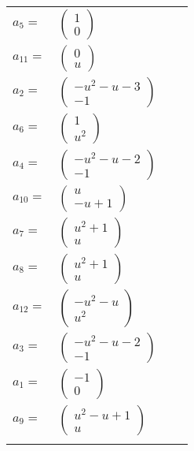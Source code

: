 \documentclass[1p]{elsarticle_modified}
\theoremstyle{definition}
\begin{document}
\begin{tabular}{m{7pt} m{180pt} m{7pt} m{180pt} }
\flushright $a_{5}=$&$\begin{pmatrix}1\\0\end{pmatrix}$ \\
\flushright $a_{11}=$&$\begin{pmatrix}0\\u\end{pmatrix}$ \\
\flushright $a_{2}=$&$\begin{pmatrix}- u^2- u-3\\-1\end{pmatrix}$ \\
\flushright $a_{6}=$&$\begin{pmatrix}1\\u^2\end{pmatrix}$ \\
\flushright $a_{4}=$&$\begin{pmatrix}- u^2- u-2\\-1\end{pmatrix}$ \\
\flushright $a_{10}=$&$\begin{pmatrix}u\\- u+1\end{pmatrix}$ \\
\flushright $a_{7}=$&$\begin{pmatrix}u^2+1\\u\end{pmatrix}$ \\
\flushright $a_{8}=$&$\begin{pmatrix}u^2+1\\u\end{pmatrix}$ \\
\flushright $a_{12}=$&$\begin{pmatrix}- u^2- u\\u^2\end{pmatrix}$ \\
\flushright $a_{3}=$&$\begin{pmatrix}- u^2- u-2\\-1\end{pmatrix}$ \\
\flushright $a_{1}=$&$\begin{pmatrix}-1\\0\end{pmatrix}$ \\
\flushright $a_{9}=$&$\begin{pmatrix}u^2- u+1\\u\end{pmatrix}$\\&\end{tabular}
\end{document}
